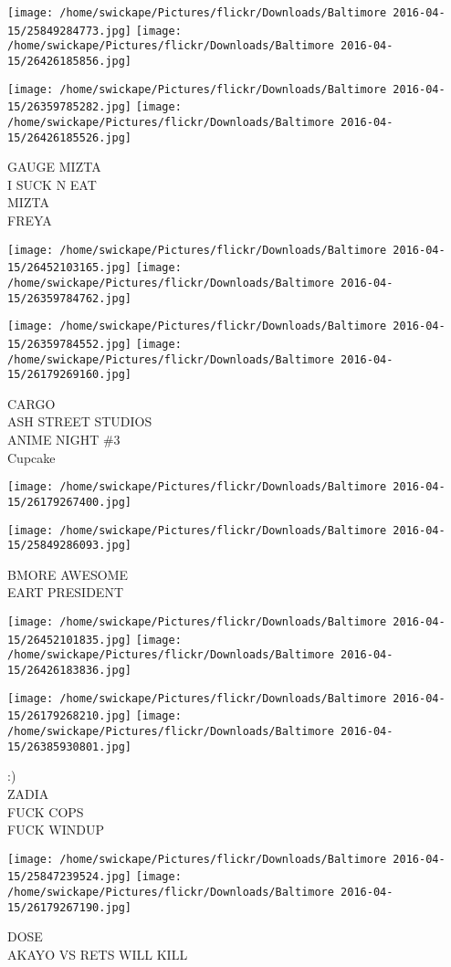 \documentclass[10pt,letterpaper]{article}
\begin{document}
\texttt{[image: /home/swickape/Pictures/flickr/Downloads/Baltimore 2016-04-15/25849284773.jpg]}
\texttt{[image: /home/swickape/Pictures/flickr/Downloads/Baltimore 2016-04-15/26426185856.jpg]}

\texttt{[image: /home/swickape/Pictures/flickr/Downloads/Baltimore 2016-04-15/26359785282.jpg]}
\texttt{[image: /home/swickape/Pictures/flickr/Downloads/Baltimore 2016-04-15/26426185526.jpg]}

GAUGE MIZTA\\
I SUCK N EAT\\
MIZTA\\
FREYA
\pagebreak

\texttt{[image: /home/swickape/Pictures/flickr/Downloads/Baltimore 2016-04-15/26452103165.jpg]}
\texttt{[image: /home/swickape/Pictures/flickr/Downloads/Baltimore 2016-04-15/26359784762.jpg]}

\texttt{[image: /home/swickape/Pictures/flickr/Downloads/Baltimore 2016-04-15/26359784552.jpg]}
\texttt{[image: /home/swickape/Pictures/flickr/Downloads/Baltimore 2016-04-15/26179269160.jpg]}

CARGO\\
ASH STREET STUDIOS\\
ANIME NIGHT \#3\\
Cupcake
\pagebreak

\texttt{[image: /home/swickape/Pictures/flickr/Downloads/Baltimore 2016-04-15/26179267400.jpg]}

\vspace{0.25in}
\texttt{[image: /home/swickape/Pictures/flickr/Downloads/Baltimore 2016-04-15/25849286093.jpg]}

BMORE AWESOME\\
EART PRESIDENT
\pagebreak

\texttt{[image: /home/swickape/Pictures/flickr/Downloads/Baltimore 2016-04-15/26452101835.jpg]}
\texttt{[image: /home/swickape/Pictures/flickr/Downloads/Baltimore 2016-04-15/26426183836.jpg]}

\texttt{[image: /home/swickape/Pictures/flickr/Downloads/Baltimore 2016-04-15/26179268210.jpg]}
\texttt{[image: /home/swickape/Pictures/flickr/Downloads/Baltimore 2016-04-15/26385930801.jpg]}

:)\\
ZADIA\\
FUCK COPS\\
FUCK WINDUP
\pagebreak

\texttt{[image: /home/swickape/Pictures/flickr/Downloads/Baltimore 2016-04-15/25847239524.jpg]}
\texttt{[image: /home/swickape/Pictures/flickr/Downloads/Baltimore 2016-04-15/26179267190.jpg]}

DOSE\\
AKAYO VS RETS WILL KILL
\pagebreak
\end{document}
